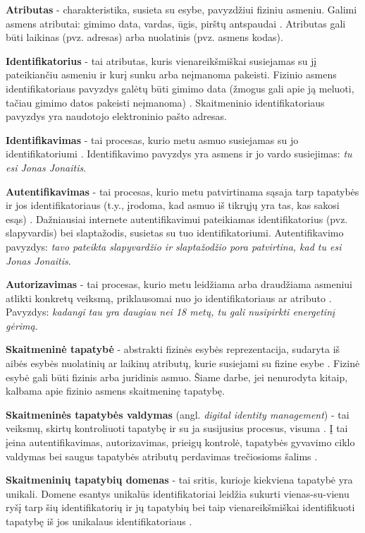 \textbf{Atributas} - charakteristika, susieta su esybe, pavyzdžiui fiziniu asmeniu. Galimi asmens atributai: gimimo data,
vardas, ūgis, pirštų antspaudai \cite{Camp2004}. Atributas gali būti laikinas (pvz. adresas) arba nuolatinis (pvz. asmens kodas).

\textbf{Identifikatorius} - tai atributas, kuris vienareikšmiškai susiejamas su jį pateikiančiu asmeniu ir kurį
sunku arba neįmanoma pakeisti. Fizinio asmens identifikatoriaus pavyzdys galėtų būti gimimo data
(žmogus gali apie ją meluoti, tačiau gimimo datos pakeisti neįmanoma) \cite{Camp2004}. Skaitmeninio identifikatoriaus
pavyzdys yra naudotojo elektroninio pašto adresas.

\textbf{Identifikavimas} - tai procesas, kurio metu asmuo susiejamas su jo identifikatoriumi \cite{Camp2004}. Identifikavimo
pavyzdys yra asmens ir jo vardo susiejimas: \textit{tu esi Jonas Jonaitis}.

\textbf{Autentifikavimas} - tai procesas, kurio metu patvirtinama sąsaja tarp tapatybės ir jos identifikatoriaus (t.y., įrodoma,
kad asmuo iš tikrųjų yra tas, kas sakosi esąs) \cite{Camp2004, Strictest2011}. Dažniausiai internete autentifikavimui pateikiamas identifikatorius
(pvz. slapyvardis) bei slaptažodis, susietas su tuo identifikatoriumi. Autentifikavimo pavyzdys:
\textit{tavo pateikta slapyvardžio ir slaptažodžio pora patvirtina, kad tu esi Jonas Jonaitis}.

\textbf{Autorizavimas} - tai procesas, kurio metu leidžiama arba draudžiama asmeniui atlikti konkretų veiksmą, priklausomai
nuo jo identifikatoriaus ar atributo \cite{Camp2004}. Pavyzdys: \textit{kadangi tau yra daugiau nei 18 metų, tu gali nusipirkti
energetinį gėrimą}. 

\textbf{Skaitmeninė tapatybė} - abstrakti fizinės esybės reprezentacija, sudaryta iš aibės esybės nuolatinių ar laikinų atributų,
kurie susiejami su fizine esybe \cite{Glasser2009, Camp2004}. Fizinė esybė gali būti fizinis arba juridinis asmuo.
Šiame darbe, jei nenurodyta kitaip, kalbama apie fizinio asmens skaitmeninę tapatybę.

\textbf{Skaitmeninės tapatybės valdymas} (angl. \textit{digital identity management}) - tai veiksmų, skirtų kontroliuoti
tapatybę ir su ja susijusius procesus, visuma \cite{Dabrowski2008}. Į tai įeina autentifikavimas, autorizavimas,
prieigų kontrolė, tapatybės gyvavimo ciklo
valdymas bei saugus tapatybės atributų perdavimas trečiosioms šalims \cite{Cao2010}.

\textbf{Skaitmeninių tapatybių domenas} - tai sritis, kurioje kiekviena tapatybė yra unikali. Domene esantys unikalūs
identifikatoriai leidžia sukurti vienas-su-vienu ryšį tarp šių identifikatorių ir jų tapatybių bei taip vienareikšmiškai
identifikuoti tapatybę iš jos unikalaus identifikatoriaus \cite{Josang2005}.

